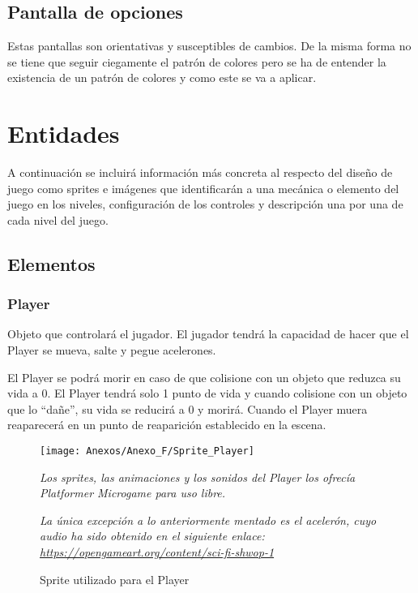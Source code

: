 \subsection{Pantalla de opciones}

Estas pantallas son orientativas y susceptibles de cambios. De la misma forma no se tiene que seguir ciegamente el patrón de colores pero se ha de entender la existencia de un patrón de colores y como este se va a aplicar.

\section{Entidades}
A continuación se incluirá información más concreta al respecto del diseño de juego como sprites e imágenes que identificarán a una mecánica o elemento del juego en los niveles, configuración de los controles y descripción una por una de cada nivel del juego.

\subsection{Elementos}
\subsubsection{Player}
Objeto que controlará el jugador. El jugador tendrá la capacidad de hacer que el Player se mueva, salte y pegue acelerones.

El Player se podrá morir en caso de que colisione con un objeto que reduzca su vida a 0. El Player tendrá solo 1 punto de vida y cuando colisione con un objeto que lo “dañe”, su vida se reducirá a 0 y morirá. Cuando el Player muera reaparecerá en un punto de reaparición establecido en la escena.

\begin{figure}[h]
\centering
\texttt{[image: Anexos/Anexo\_F/Sprite\_Player]}
\caption{Sprite utilizado para el Player}
\raggedright
\textit{Los sprites, las animaciones y los sonidos del Player los ofrecía Platformer Microgame para uso libre.}

\textit{La única excepción a lo anteriormente mentado es el acelerón, cuyo audio ha sido obtenido en el siguiente enlace: \url{https://opengameart.org/content/sci-fi-shwop-1}}
\end{figure}
\clearpage

